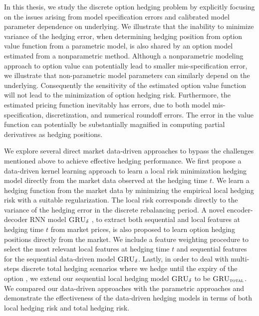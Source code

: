 \documentclass[letterpaper,12pt,titlepage,oneside,final]{book}
\numberwithin{equation}{section}
\theoremstyle{definition}
\newcommand{\model}{\textsc{GRU}_\delta}
\newcommand{\modelT}{\textsc{GRU}_{\textsc{total}}}
\begin{document}
In this thesis, we study the discrete option hedging problem by  explicitly focusing on the issues arising from  model specification errors and calibrated model parameter dependence on underlying.
We illustrate that the inability to minimize variance of the hedging error, when determining hedging position from option value function from a parametric model, is also shared by an option model estimated from a nonparametric method. Although a nonparametric modeling approach to option value can potentially lead to smaller mis-specification error, we illustrate that non-parametric model parameters can similarly depend on the underlying. Consequently the sensitivity of the estimated option value function will not lead to the minimization of option hedging risk.
Furthermore,  the estimated pricing function inevitably has errors, due to both model mis-specification, discretization, and numerical roundoff errors.
The error in the value function can potentially be substantially magnified in computing partial derivatives as hedging positions.

We explore several direct market data-driven approaches to bypass  the challenges mentioned above to achieve effective hedging performance.
We first propose a  data-driven kernel learning approach \cite{knian2017} to learn a local risk minimization hedging model directly from the market data observed at the hedging time $t$.  We learn a  hedging function from the market data by minimizing  the  empirical local hedging  risk with a suitable regularization. The local risk corresponds directly to the variance of the hedging error in the discrete rebalancing period. A novel encoder-decoder  RNN model $\model$ \cite{knian2019}, to extract both sequential and local features at hedging time $t$ from market prices, is also proposed to learn option hedging positions directly from the market. We include a feature weighting procedure to select the most relevant local features at hedging time $t$ and sequential features for the sequential data-driven model $\model$. Lastly, in order to deal with multi-steps discrete total hedging scenarios where we hedge until the expiry of the option \cite{knian2020}, we extend our sequential local hedging model $\model$ to be $\modelT$. We compared our data-driven approaches with the parametric approaches and demonstrate the effectiveness of the data-driven hedging models in terms of both local hedging risk and total hedging risk.





\end{document}
